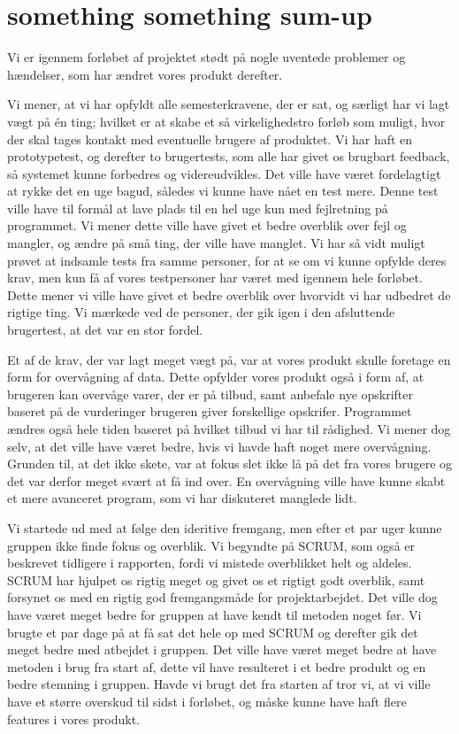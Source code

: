 \chapter{something something sum-up}
Vi er igennem forløbet af projektet stødt på nogle uventede problemer og hændelser, som har ændret vores produkt derefter.

Vi mener, at vi har opfyldt alle semesterkravene, der er sat, og særligt har vi lagt vægt på én ting;
hvilket er at skabe et så virkelighedstro forløb som muligt, hvor der skal tages kontakt med eventuelle brugere af produktet.
Vi har haft en prototypetest, og derefter to brugertests, som alle har givet os brugbart feedback, så systemet kunne forbedres og videreudvikles.
Det ville have været fordelagtigt at rykke det en uge bagud, således vi kunne have nået en test mere.
Denne test ville have til formål at lave plads til en hel uge kun med fejlretning på programmet.
Vi mener dette ville have givet et bedre overblik over fejl og mangler, og ændre på små ting, der ville have manglet.
Vi har så vidt muligt prøvet at indsamle tests fra samme personer, for at se om vi kunne opfylde deres krav, men kun få af vores testpersoner har været med igennem hele forløbet.
Dette mener vi ville have givet et bedre overblik over hvorvidt vi har udbedret de rigtige ting.
Vi mærkede ved de personer, der gik igen i den afsluttende brugertest, at det var en stor fordel.

Et af de krav, der var lagt meget vægt på, var at vores produkt skulle foretage en form for overvågning af data.
Dette opfylder vores produkt også i form af, at brugeren kan overvåge varer, der er på tilbud, samt anbefale nye opskrifter baseret på de vurderinger brugeren giver forskellige opskrifer.
Programmet ændres også hele tiden baseret på hvilket tilbud vi har til rådighed.
Vi mener dog selv, at det ville have været bedre, hvis vi havde haft noget mere overvågning.
Grunden til, at det ikke skete, var at fokus slet ikke lå på det fra vores brugere og det var derfor meget svært at få ind over.
En overvågning ville have kunne skabt et mere avanceret program, som vi har diskuteret manglede lidt.

Vi startede ud med at følge den ideritive fremgang, men efter et par uger kunne gruppen ikke finde fokus og overblik.
Vi begyndte på SCRUM, som også er beskrevet tidligere i rapporten, fordi vi mistede overblikket helt og aldeles.
SCRUM har hjulpet os rigtig meget og givet os et rigtigt godt overblik, samt forsynet os med en rigtig god fremgangsmåde for projektarbejdet.
Det ville dog have været meget bedre for gruppen at have kendt til metoden noget før.
Vi brugte et par dage på at få sat det hele op med SCRUM og derefter gik det meget bedre med atbejdet i gruppen.
Det ville have været meget bedre at have metoden i brug fra start af, dette vil have resulteret i et bedre produkt og en bedre stemning i gruppen.
Havde vi brugt det fra starten af tror vi, at vi ville have et større overskud til sidst i forløbet, og måske kunne have haft flere features i vores produkt.


